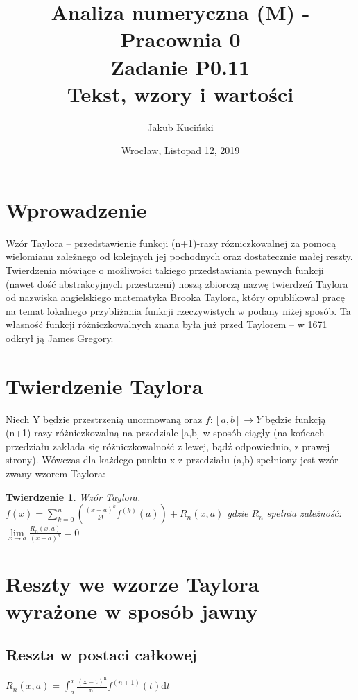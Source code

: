 \documentclass[11pt,wide]{article}
\title{Analiza numeryczna (M) - Pracownia 0 \\ Zadanie P0.11\\
Tekst, wzory i wartości}
\date{Wrocław, Listopad 12, 2019}
\author{Jakub Kuciński}
\begin{document}
\maketitle
\thispagestyle{empty} 
\tableofcontents

\section{Wprowadzenie}
Wzór Taylora -- przedstawienie funkcji (n+1)-razy różniczkowalnej za pomocą wielomianu zależnego od kolejnych jej pochodnych oraz dostatecznie małej reszty. Twierdzenia mówiące o możliwości takiego przedstawiania pewnych funkcji (nawet dość abstrakcyjnych przestrzeni) noszą zbiorczą nazwę twierdzeń Taylora od nazwiska angielskiego matematyka Brooka Taylora, który opublikował pracę na temat lokalnego przybliżania funkcji rzeczywistych w podany niżej sposób. Ta własność funkcji różniczkowalnych znana była już przed Taylorem -- w 1671 odkrył ją James Gregory. 

\section{Twierdzenie Taylora}
Niech Y będzie przestrzenią unormowaną oraz  \({\displaystyle f: [a,b]\to Y}\)  będzie funkcją (n+1)-razy różniczkowalną na przedziale [a,b] w sposób ciągły (na końcach przedziału zakłada się różniczkowalność z lewej, bądź odpowiednio, z prawej strony). Wówczas dla każdego punktu x z przedziału (a,b) spełniony jest wzór zwany wzorem Taylora:

\newtheorem*{mydef}{Twierdzenie}

\begin{mydef} Wzór Taylora.\\
\(f(x) = \displaystyle\sum_{k=0}^{n} \left( \frac{(x-a)^k}{k!} f^{(k)}(a) \right) + R_n (x, a)\) 
gdzie \(R_n\) spełnia zależność:\\
\(\displaystyle\lim\limits_{x \to a} \frac{R_n(x,a)}{(x-a)^n} = 0\)

\end{mydef}



\section{Reszty we wzorze Taylora wyrażone w sposób jawny}
\subsection{Reszta w postaci całkowej}
\(\displaystyle R_n(x,a)=\int_a^x \mathrm{\frac{{(x-t)}^{n}}{n!}} f^{(n+1)}(t)\mathrm{d}t  \)
\end{document}
